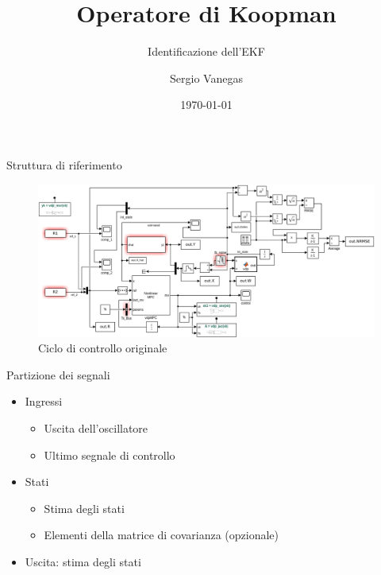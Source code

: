 \documentclass{beamer}
\title{Operatore di Koopman}
\subtitle{Identificazione dell'EKF}
\author{Sergio Vanegas}
\institute{Modelway S.r.l.}
\date{\today}
\begin{document}
\frame{\titlepage}

\begin{frame}{Struttura di riferimento}
    \begin{figure}
        \centering
        \includegraphics[width=\textwidth]{Figures/Kalman_nlMPC.png}
        \caption{Ciclo di controllo originale}
    \end{figure}
\end{frame}

\begin{frame}{Partizione dei segnali}
    \begin{itemize}
        \item Ingressi
        \begin{itemize}
            \item Uscita dell'oscillatore
            \item Ultimo segnale di controllo
        \end{itemize}
        \item Stati
        \begin{itemize}
            \item Stima degli stati
            \item Elementi della matrice di covarianza (opzionale)
        \end{itemize}
        \item Uscita: stima degli stati
    \end{itemize}
\end{frame}
\end{document}

